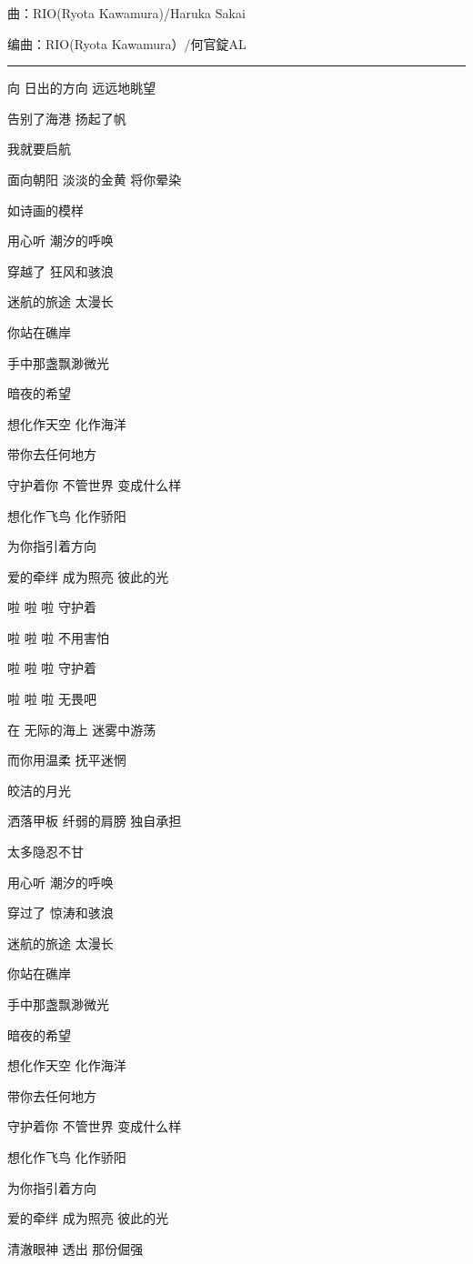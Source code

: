 \documentclass[]{ctexbook}
\begin{document}
曲：RIO(Ryota Kawamura)/Haruka Sakai

编曲：RIO(Ryota Kawamura）/何官錠AL

\begin{center}\rule{0.5\linewidth}{0.5pt}\end{center}

向 日出的方向 远远地眺望

告别了海港 扬起了帆

我就要启航

面向朝阳 淡淡的金黄 将你晕染

如诗画的模样

用心听 潮汐的呼唤

穿越了 狂风和骇浪

迷航的旅途 太漫长

你站在礁岸

手中那盏飘渺微光

暗夜的希望

想化作天空 化作海洋

带你去任何地方

守护着你 不管世界 变成什么样

想化作飞鸟 化作骄阳

为你指引着方向

爱的牵绊 成为照亮 彼此的光

啦 啦 啦 守护着

啦 啦 啦 不用害怕

啦 啦 啦 守护着

啦 啦 啦 无畏吧

在 无际的海上 迷雾中游荡

而你用温柔 抚平迷惘

皎洁的月光

洒落甲板 纤弱的肩膀 独自承担

太多隐忍不甘

用心听 潮汐的呼唤

穿过了 惊涛和骇浪

迷航的旅途 太漫长

你站在礁岸

手中那盏飘渺微光

暗夜的希望

想化作天空 化作海洋

带你去任何地方

守护着你 不管世界 变成什么样

想化作飞鸟 化作骄阳

为你指引着方向

爱的牵绊 成为照亮 彼此的光

清澈眼神 透出 那份倔强
\end{document}
